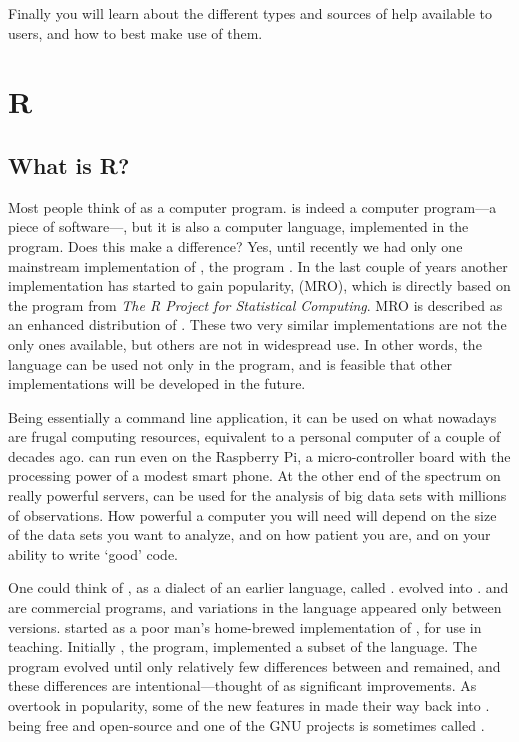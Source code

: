 \documentclass[krantz2]{krantz}\usepackage{knitr}%
\begin{document}
Finally you will learn about the different types and sources of help available to \Rlang users, and how to best make use of them.

\section{R}

\subsection{What is R?}

Most people think of \Rpgrm as a computer program. \Rpgrm is indeed a computer program---a piece of software---, but it is also a computer language, implemented in the \Rpgrm program. Does this make a difference? Yes, until recently we had only one mainstream implementation of \Rlang, the program \Rpgrm. In the last couple of years another implementation has started to gain popularity,  (MRO), which is directly based on the \Rpgrm program from \textit{The R Project for Statistical Computing}. MRO is described as an enhanced distribution of \Rpgrm. These two very similar implementations are not the only ones available, but others are not in widespread use. In other words, the \Rlang language can be used not only in the \Rpgrm program, and is feasible that other implementations will be developed in the future.

Being \Rpgrm essentially a command line application, it can be used on what nowadays are frugal computing resources, equivalent to a personal computer of a couple of decades ago. \Rpgrm can run even on the Raspberry Pi, a micro-controller board with the processing power of a modest smart phone. At the other end of the spectrum on really powerful servers, \Rpgrm can be used for the analysis of big data sets with millions of observations. How powerful a computer you will need will depend on the size of the data sets you want to analyze, and on how patient you are, and on your ability to write `good' code.

One could think of \Rlang, as a dialect of an earlier language, called \Slang. \Slang evolved into \Splang \autocite{Becker1988}. \Slang and \Splang are commercial programs, and variations in the language appeared only between versions. \Rlang started as a poor man's home-brewed implementation of \Slang, for use in teaching. Initially \Rpgrm, the program, implemented a subset of the \Slang language. The \Rpgrm program evolved until only relatively few differences between \Slang and \Rlang remained, and these differences are intentional---thought of as significant improvements. As \Rlang overtook \Splang in popularity, some of the new features in \Rlang made their way back into \Splang. \Rpgrm being free and open-source and one of the GNU projects is sometimes called .
\end{document}
